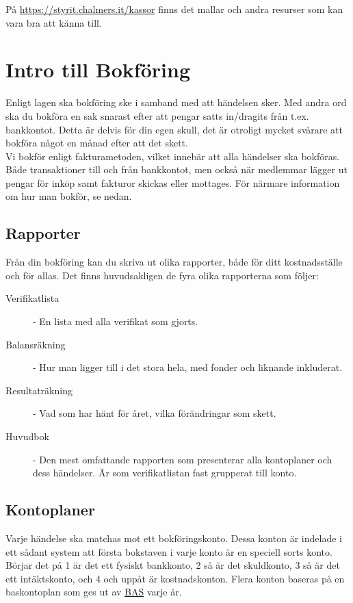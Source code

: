 \documentclass{article}
\begin{document}
På \href{https://styrit.chalmers.it/kassor}{https://styrit.chalmers.it/kassor} finns det mallar och andra resurser som kan vara bra att känna till.

\section{Intro till Bokföring}
Enligt lagen ska bokföring ske i samband med att händelsen sker. Med andra ord ska du bokföra en sak snarast efter att pengar satts in/dragits från t.ex. bankkontot. 
Detta är delvis för din egen skull, det är otroligt mycket svårare att bokföra något en månad efter att det skett.\\

Vi bokför enligt fakturametoden, vilket innebär att alla händelser ska bokföras. Både transaktioner till och från bankkontot, men också när medlemmar lägger ut pengar för inköp samt fakturor skickas eller mottages. För närmare information om hur man bokför, se nedan. 

\subsection*{Rapporter}
Från din bokföring kan du skriva ut olika rapporter, både för ditt kostnadsställe och för allas. Det finns huvudsakligen de fyra olika rapporterna som följer: 

\begin{description}
    \item[Verifikatlista] - En lista med alla verifikat som gjorts. 
    \item[Balansräkning] - Hur man ligger till i det stora hela, med fonder och liknande inkluderat.
    \item[Resultaträkning] - Vad som har hänt för året, vilka förändringar som skett.
    \item[Huvudbok] - Den mest omfattande rapporten som presenterar alla kontoplaner och dess händelser. Är som verifikatlistan fast grupperat till konto.
\end{description}

\subsection*{Kontoplaner}
Varje händelse ska matchas mot ett bokföringskonto. Dessa konton är indelade i ett sådant system att första bokstaven i varje konto är en speciell sorts konto. Börjar det på 1 är det ett fysiskt bankkonto, 2 så är det skuldkonto, 3 så är det ett intäktskonto, och 4 och uppåt är kostnadskonton. Flera konton baseras på en baskontoplan som ges ut av \href{http://www.bas.se/}{BAS} varje år.  
\end{document}

